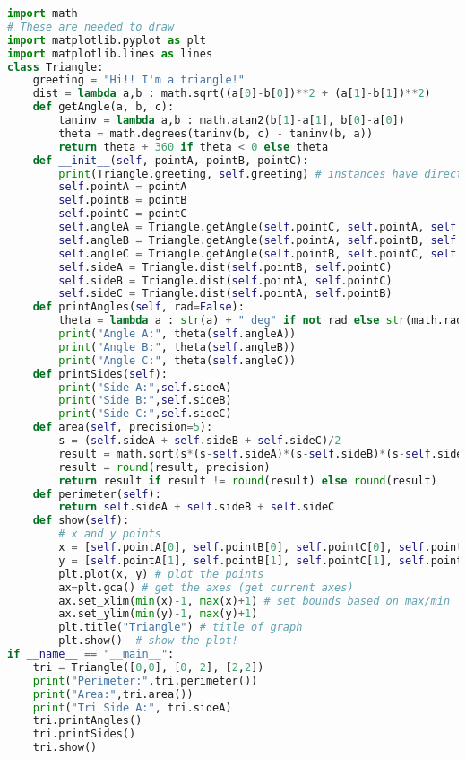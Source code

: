 \documentclass[12pt]{article}
\begin{document}
\begin{lstlisting}[language=Python]
import math
# These are needed to draw
import matplotlib.pyplot as plt 
import matplotlib.lines as lines
class Triangle:
    greeting = "Hi!! I'm a triangle!"
    dist = lambda a,b : math.sqrt((a[0]-b[0])**2 + (a[1]-b[1])**2)
    def getAngle(a, b, c):
        taninv = lambda a,b : math.atan2(b[1]-a[1], b[0]-a[0])
        theta = math.degrees(taninv(b, c) - taninv(b, a))
        return theta + 360 if theta < 0 else theta
    def __init__(self, pointA, pointB, pointC):
        print(Triangle.greeting, self.greeting) # instances have direct access to class variables
        self.pointA = pointA
        self.pointB = pointB
        self.pointC = pointC
        self.angleA = Triangle.getAngle(self.pointC, self.pointA, self.pointB)
        self.angleB = Triangle.getAngle(self.pointA, self.pointB, self.pointC)
        self.angleC = Triangle.getAngle(self.pointB, self.pointC, self.pointA)
        self.sideA = Triangle.dist(self.pointB, self.pointC)
        self.sideB = Triangle.dist(self.pointA, self.pointC)
        self.sideC = Triangle.dist(self.pointA, self.pointB)
    def printAngles(self, rad=False):
        theta = lambda a : str(a) + " deg" if not rad else str(math.radians(a)) + " rad"
        print("Angle A:", theta(self.angleA))
        print("Angle B:", theta(self.angleB))
        print("Angle C:", theta(self.angleC))
    def printSides(self):
        print("Side A:",self.sideA)
        print("Side B:",self.sideB)
        print("Side C:",self.sideC)
    def area(self, precision=5):
        s = (self.sideA + self.sideB + self.sideC)/2
        result = math.sqrt(s*(s-self.sideA)*(s-self.sideB)*(s-self.sideC))
        result = round(result, precision)
        return result if result != round(result) else round(result)
    def perimeter(self):
        return self.sideA + self.sideB + self.sideC
    def show(self):        
        # x and y points
        x = [self.pointA[0], self.pointB[0], self.pointC[0], self.pointA[0]]
        y = [self.pointA[1], self.pointB[1], self.pointC[1], self.pointA[1]]
        plt.plot(x, y) # plot the points
        ax=plt.gca() # get the axes (get current axes)
        ax.set_xlim(min(x)-1, max(x)+1) # set bounds based on max/min
        ax.set_ylim(min(y)-1, max(y)+1)
        plt.title("Triangle") # title of graph
        plt.show()  # show the plot!
if __name__ == "__main__":
    tri = Triangle([0,0], [0, 2], [2,2])
    print("Perimeter:",tri.perimeter())
    print("Area:",tri.area())
    print("Tri Side A:", tri.sideA)
    tri.printAngles()
    tri.printSides()
    tri.show()
\end{lstlisting}
\end{document}
